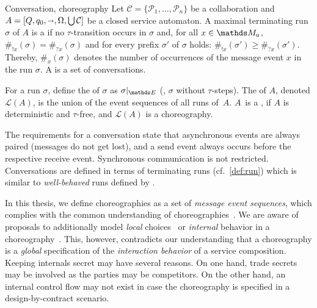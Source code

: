 \begin{definition}{Conversation, choreography}%
%
%
%
%
Let $\mathcal{C}=\{\mathcal{P}_{1},\ldots,\mathcal{P}_{n}\}$ be a collaboration and $A=[Q,q_{0},{\shortrightarrow},\Omega,\bigcup \mathcal{C}]$ be a closed service automaton. A maximal terminating run $\sigma$ of $A$ is a  if no $\tau$-transition occurs in $\sigma$ and, for all $x\in \M_{a}$,
$\#_{!x}(\sigma)=\#_{?x}(\sigma)$ and for every prefix $\sigma'$ of $\sigma $ holds: $\#_{!x}(\sigma')\geq\#_{?x}(\sigma')$. Thereby, $\#_{x}(\sigma)$ denotes the number of occurrences of the message event $x$ in the run $\sigma$. A  is a set of conversations.

For a run $\sigma$, define the  of $\sigma$ as $\sigma|_{\E}$ (\ie, $\sigma$ without $\tau$-steps). The  of $A$, denoted $\mathcal{L}(A)$, is the union of the event sequences of all runs of~$A$. $A$~is a , if $A$ is deterministic and $\tau$-free, and $\mathcal{L}(A)$ is a choreography.\label{def:realizability_choreography}
\end{definition}

The requirements for a conversation state that asynchronous events are always paired (messages do not get lost), and a send event always occurs before the respective receive event. Synchronous communication is not restricted. Conversations are defined in terms of terminating runs (cf.\ \autoref{def:run}) which is similar to \emph{well-behaved} runs defined by \citet{BultanFF_2009_icws}.

In this thesis, we define choreographies as a set of \emph{message event sequences}, which complies with the common understanding of choreographies~\cite{Peltz_2003_ieee,BultanFHS_2003_www,w3c_2003_glossary}. We are aware of proposals to additionally model \emph{local} choices~\cite{DeckerW_2007_bpm} or \emph{internal} behavior in a choreography~\cite{KoppL_2009_zeus}. This, however, contradicts our understanding that a choreography is a \emph{global} specification of the \emph{interaction behavior} of a service composition. Keeping internals secret may have several reasons. On one hand, trade secrets may be involved as the parties may be competitors. On the other hand, an internal control flow may not exist in case the choreography is specified in a design-by-contract scenario.

